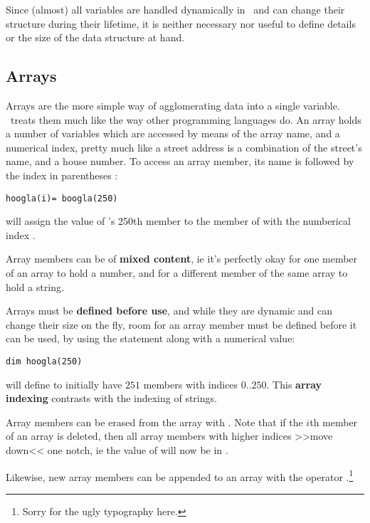Since (almost) all variables are handled dynamically in \SB\ and can change their
structure during their lifetime, it is neither necessary nor useful
to define details or the size of the data structure at hand.

\subsection{Arrays \label{array}}

Arrays are the more simple way of agglomerating data into a single
variable. \SB\ treats them much like the way other programming languages
do. An array holds a number of variables which are accessed by means of
the array name, and a numerical index, pretty much like a street address
is a combination of the street's name, and a house number. To access an
array member, its name is followed by the index in parentheses \Co{()}:

\begin{lstlisting}
hoogla(i)= boogla(250)
\end{lstlisting}

will assign the value of 's 250th member to the member of
 with the numberical index .

Array members can be of \textbf{mixed content}, ie it's perfectly okay
for one member of an array to hold a number, and for a different member
of the same array to hold a string.

Arrays must be \textbf{defined before use}, and while they are dynamic
and can change their size on the fly, room for an array member must be
defined before it can be used, by using the  statement along
with a numerical value:

\begin{lstlisting}
dim hoogla(250)
\end{lstlisting}

will define  to initially have $251$ members with indices
$0..250$. This \textbf{array indexing}  
contrasts with the indexing of strings.

Array members can be erased from the array with . Note that
if the $i$th member of an array is deleted, then all array members with
higher indices >>move down<< one notch, ie the value of  will
now be in . 

Likewise, new array members can be appended to an array with the
operator \Co{$<<$}.\footnote{Sorry for the ugly typography here.}

